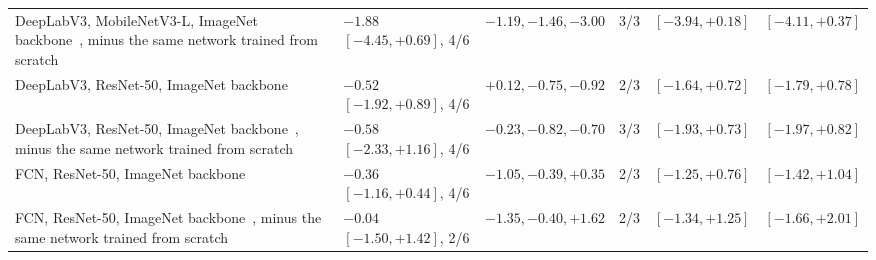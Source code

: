 \begin{table}[tp]
\begin{tabularx}{\textwidth}{@{}>{\raggedright\arraybackslash}X l l c l l@{}}
\quad DeepLabV3, MobileNetV3-L, ImageNet backbone~\cite{chen2017deeplabv3,howard2019mobilenetv3}, minus the same network trained from scratch & $-1.88$ $[-4.45, +0.69]$, 4/6 & $-1.19, -1.46, -3.00$ & 3/3 & $[-3.94, +0.18]$ & $[-4.11, +0.37]$ \\
\quad DeepLabV3, ResNet-50, ImageNet backbone~\cite{chen2017deeplabv3,he2016resnet} & $-0.52$ $[-1.92, +0.89]$, 4/6 & $+0.12, -0.75, -0.92$ & 2/3 & $[-1.64, +0.72]$ & $[-1.79, +0.78]$ \\
\quad DeepLabV3, ResNet-50, ImageNet backbone~\cite{chen2017deeplabv3,he2016resnet}, minus the same network trained from scratch & $-0.58$ $[-2.33, +1.16]$, 4/6 & $-0.23, -0.82, -0.70$ & 3/3 & $[-1.93, +0.73]$ & $[-1.97, +0.82]$ \\
\quad FCN, ResNet-50, ImageNet backbone~\cite{long2015fcn,he2016resnet} & $-0.36$ $[-1.16, +0.44]$, 4/6 & $-1.05, -0.39, +0.35$ & 2/3 & $[-1.25, +0.76]$ & $[-1.42, +1.04]$ \\
\quad FCN, ResNet-50, ImageNet backbone~\cite{long2015fcn,he2016resnet}, minus the same network trained from scratch & $-0.04$ $[-1.50, +1.42]$, 2/6 & $-1.35, -0.40, +1.62$ & 2/3 & $[-1.34, +1.25]$ & $[-1.66, +2.01]$ \\
\bottomrule
\end{tabularx}
\end{table}

